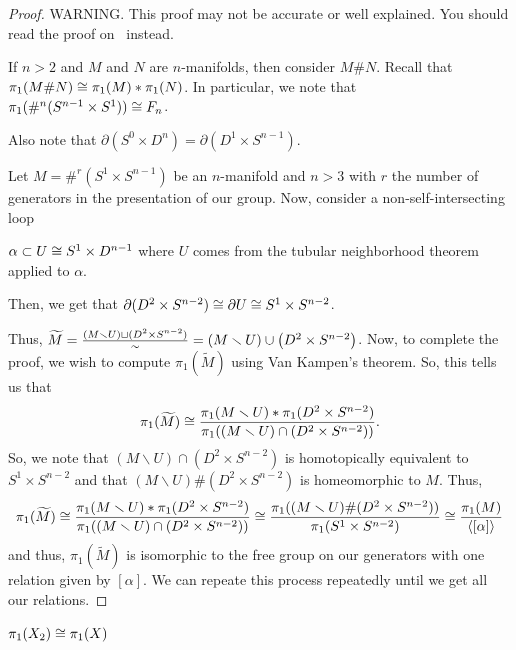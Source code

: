 \documentclass[11pt,leqno,oneside]{amsart}
\numberwithin{thm}{section}
\renewcommand{\setminus}{\smallsetminus}
\renewcommand{\d}{\partial}
\newcommand{\fund}[1][1]{\pi_{#1}}
\newcommand{\x}{\times}
\begin{document}
\begin{proof}
  WARNING.  This proof may not be accurate or well explained.  You should read the proof on~\cite{chiasme} instead.

  If $n > 2$ and $M$ and $N$ are $n$-manifolds, then consider $M \#
  N$. Recall that $\fund(M \# N) \isom \fund(M) * \fund(N)$. In
  particular, we note that $\fund(\#^n (S^{n-1} \times S^1)) \isom
  F_n$.


  Also note that $\d(S^0 \x D^n) = \d(D^1 \x S^{n-1})$.

  Let $M = \#^r (S^1 \times S^{n-1})$ be an $n$-manifold and $n > 3$
  with $r$ the number of generators in the presentation of our group.
  Now, consider a non-self-intersecting loop

  $\alpha \subset U \isom S^1 \x D^{n-1}$ where $U$ comes from the
  tubular neighborhood theorem applied to $\alpha$.

  Then, we get that $\d(D^2 \x S^{n-2}) \isom \d U \isom S^1 \x
  S^{n-2}$.



  Thus, $\widetilde{M} = \frac{{(M \setminus U) \dunion (D^2 \x S^{n-2})}}{\sim} = \left( M
    \setminus U \right) \union \left( D^2 \times S^{n-2}
  \right)$. Now, to complete the proof, we wish to compute
  $\fund(\tilde{M})$ using Van Kampen's theorem. So, this tells us
  that \[
    \fund(\widetilde{M}) \isom \frac{\fund(M \setminus U) * \fund(D^2
      \times S^{n-2})}{\fund((M \setminus U) \cap (D^2 \times S^{n-2}))}.
  \]
  So, we note that $(M \setminus U) \cap (D^2 \times S^{n-2})$ is
  homotopically equivalent to $S^1 \times S^{n-2}$ and that $(M
  \setminus U) \# (D^2 \times S^{n-2})$ is homeomorphic to
  $M$. Thus, \[
\fund(\widetilde{M}) \isom \frac{\fund(M \setminus U) * \fund(D^2
      \times S^{n-2})}{\fund((M \setminus U) \cap (D^2 \times
      S^{n-2}))} \isom \frac{\fund((M \setminus U) \# (D^2 \times
      S^{n-2}))}{\fund(S^1 \times S^{n-2})} \isom \frac{\fund(M)}{\langle [\alpha] \rangle}
  \]
  and thus, $\fund(\widetilde{M})$ is isomorphic to the free group on
  our generators with one relation given by $[\alpha]$. We can repeate
  this process repeatedly until we get all our relations.
\end{proof}
\begin{thm}
  $\fund(X_2) \isom \fund(X)$
\end{thm}
\end{document}
